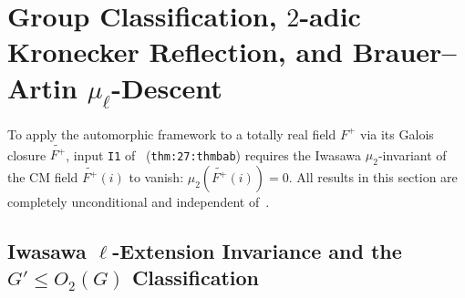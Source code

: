 \section{Group Classification, $2$-adic Kronecker Reflection, and Brauer--Artin $\mu_\ell$-Descent}\label{sec:3:brauer}

To apply the automorphic framework to a totally real field $F^+$ via its Galois closure $\widetilde{F^+}$, input \texttt{I1} of~\cite[Ch.~27]{Alpoge2026} (\texttt{thm:27:thmbab}) requires the Iwasawa $\mu_2$-invariant of the CM field $\widetilde{F^+}(i)$ to vanish: $\mu_2(\widetilde{F^+}(i)) = 0$. All results in this section are completely unconditional and independent of~\cite{Alpoge2026}.

\subsection{Iwasawa $\ell$-Extension Invariance and the $G' \le O_2(G)$ Classification}\label{sec:3:group}

